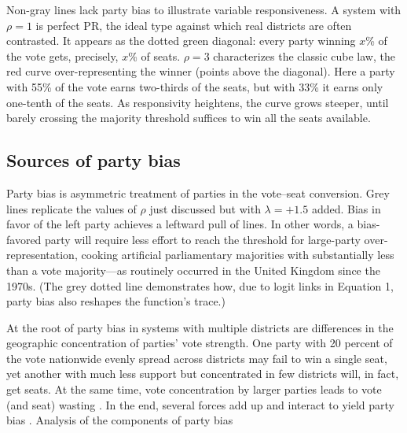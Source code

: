 \documentclass[letter,12pt]{article}
\begin{document}
Non-gray lines lack party bias to illustrate variable responsiveness. A system with $\rho=1$ is perfect PR, the ideal type against which real districts are often contrasted. It appears as the dotted green diagonal: every party winning $x$\% of the vote gets, precisely, $x$\% of seats. $\rho=3$ characterizes the classic cube law, the red curve over-representing the winner (points above the diagonal). Here a party with 55\% of the vote earns two-thirds of the seats, but with 33\% it earns only one-tenth of the seats. As responsivity heightens, the curve grows steeper, until barely crossing the majority threshold suffices to win all the seats available. 

\subsection{Sources of party bias}

Party bias is asymmetric treatment of parties in the vote--seat conversion. Grey lines replicate the values of $\rho$ just discussed but with $\lambda = +1.5$ added. Bias in favor of the left party achieves a leftward pull of lines. In other words, a bias-favored party will require less effort to reach the threshold for large-party over-representation, cooking artificial parliamentary majorities with substantially less than a vote majority---as routinely occurred in the United Kingdom since the 1970s. (The grey dotted line demonstrates how, due to logit links in Equation 1, party bias also reshapes the function's trace.) %

At the root of party bias in systems with multiple districts are differences in the geographic concentration of parties' vote strength. One party with 20 percent of the vote nationwide evenly spread across districts may fail to win a single seat, yet another with much less support but concentrated in few districts will, in fact, get seats. At the same time, vote concentration by larger parties leads to vote (and seat) wasting \citep{calvo.roddenMultipartyPlurality2015}. In the end, several forces add up and interact to yield party bias \citep{gudgin.taylor.1980decomposeBias}. Analysis of the components of party bias 
\end{document}
